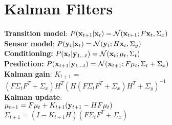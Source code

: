 \section{Kalman Filters}
\textbf{Transition model}:
\mbox{$P({\mathbf{x}}_{t+1}|{\mathbf{x}}_t)=\mathcal{N}({\mathbf{x}}_{t+1};F{\mathbf{x}}_t, \Sigma_x)$}\\
\textbf{Sensor model}:
$P({\mathbf{y}}_{t}|{\mathbf{x}}_t)=\mathcal{N}({\mathbf{y}}_{t};H{\mathbf{x}}_t, \Sigma_y)$\\
\textbf{Conditioning:} $P({\mathbf{x}}_t|{\mathbf{y}}_{1\ldots t}) = \mathcal{N}({\mathbf{x}}_t;\mu_t, \Sigma_t)$\\
\textbf{Prediction:} $P({\mathbf{x}}_{t+1}|{\mathbf{y}}_{1\ldots t}) = \mathcal{N}({\mathbf{x}}_{t+1};F\mu_t, \Sigma_t + \Sigma_x)$\\
\textbf{Kalman gain}:
$K_{t+1}=$\\$(F\Sigma_t F^T+\Sigma_x)H^T(H(F\Sigma_t F^T+\Sigma_x)H^T+ \Sigma_y)^{-1}$\\
\textbf{Kalman update}:\\
$\mu_{t+1}=F\mu_t+K_{t+1}({\mathbf{y}}_{t+1}-HF\mu_t)$\\
$\Sigma_{t+1}=(I-K_{t+1}H)(F\Sigma_tF^T + \Sigma_x)$\\
